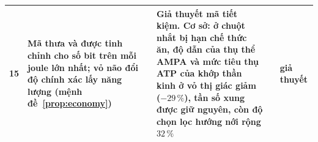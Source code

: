 {\begin{longtable}{>{\raggedright}p{0.5cm}>{\raggedright}p{4.0cm}>{\raggedright}p{5.6cm}>{\raggedright}p{2.3cm}>{\raggedright\arraybackslash}p{1.7cm}}
15 & Mã thưa và được tinh chỉnh cho số bit trên mỗi joule lớn nhất; vỏ não đổi độ chính xác lấy năng lượng (mệnh đề~\ref{prop:economy}) & Giả thuyết mã tiết kiệm. Cơ sở: ở chuột nhắt bị hạn chế thức ăn, độ dẫn của thụ thể AMPA và mức tiêu thụ ATP của khớp thần kinh ở vỏ thị giác giảm ($-29\,\%$), tần số xung được giữ nguyên, còn độ chọn lọc hướng nới rộng $32\,\%$ & \cite{Barlow1961,Padamsey2022} & giả thuyết \\
\bottomrule
\end{longtable}}
